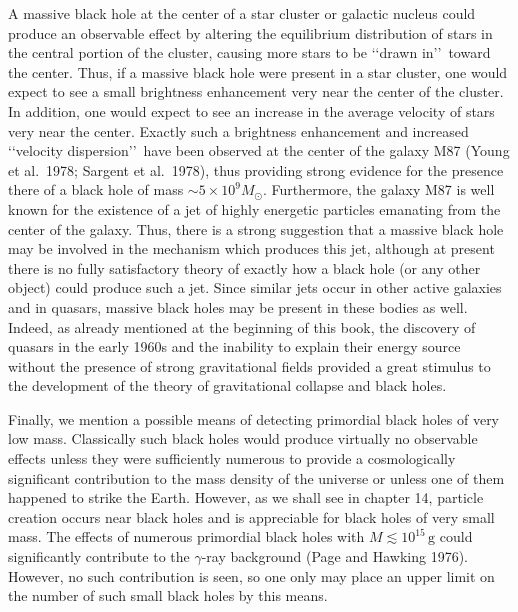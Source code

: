 A massive black hole at the center of a star cluster or galactic nucleus could produce
an observable effect by altering the equilibrium distribution of stars in the central
portion of the cluster, causing more stars to be \lq\lq drawn in\rq\rq\ toward the center.
Thus, if a massive black hole were present in a star cluster, one would expect to see a
small brightness enhancement very near the center of the cluster. In addition, one
would expect to see an increase in the average velocity of stars very near the center.
Exactly such a brightness enhancement and increased \lq\lq velocity dispersion\rq\rq\
have been observed at the center of the galaxy M87 (Young et al.\ 1978; Sargent et
al.\ 1978), thus providing strong evidence for the presence there of a black hole of
mass \(\sim5\times10^9M_\odot\). Furthermore, the galaxy M87 is well known for the
existence of a jet of highly energetic particles emanating from the center of the
galaxy. Thus, there is a strong suggestion that a massive black hole may be involved
in the mechanism which produces this jet, although at present there is no fully
satisfactory theory of exactly how a black hole (or any other object) could produce
such a jet. Since similar jets occur in other active galaxies and in quasars, massive
black holes may be present in these bodies as well. Indeed, as already mentioned at
the beginning of this book, the discovery of quasars in the early 1960s and the
inability to explain their energy source without the presence of strong gravitational
fields provided a great stimulus to the development of the theory of gravitational
collapse and black holes.

Finally, we mention a possible means of detecting primordial black holes of very low
mass. Classically such black holes would produce virtually no observable effects
unless they were sufficiently numerous to provide a cosmologically significant
contribution to the mass density of the universe or unless one of them happened to
strike the Earth. However, as we shall see in chapter 14, particle creation occurs near
black holes and is appreciable for black holes of very small mass. The effects of
numerous primordial black holes with \(M\lesssim10^{15}\,\mathrm{g}\) could
significantly contribute to the \(\gamma\)-ray background (Page and Hawking 1976).
However, no such contribution is seen, so one only may place an upper limit on the
number of such small black holes by this means.

